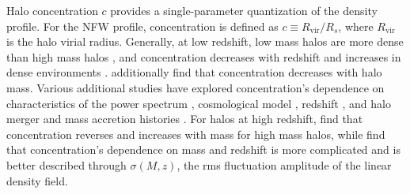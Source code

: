 
Halo concentration $c$ provides a single-parameter quantization of the density profile.  For the NFW profile, concentration is defined as $c \equiv R_{\mathrm{vir}} / R_{s}$, where $R_{\mathrm{vir}}$ is the halo virial radius.  Generally, at low redshift, low mass halos are more dense than high mass halos \citep{1997ApJ...490..493N}, and concentration decreases with redshift and increases in dense environments \citep{2001MNRAS.321..559B}.  \citet{2007MNRAS.381.1450N} additionally find that concentration decreases with halo mass.  Various additional studies have explored concentration's dependence on characteristics of the power spectrum \citep{2001ApJ...554..114E}, cosmological model \citep{2008MNRAS.391.1940M}, redshift \citep{2008MNRAS.387..536G, 2011MNRAS.411..584M}, and halo merger and mass accretion histories \citep{2002ApJ...568...52W, 2003MNRAS.339...12Z, 2009ApJ...707..354Z}.  For halos at high redshift, \citet{2011ApJ...740..102K} find that concentration reverses and increases with mass for high mass halos, while \citet{2012MNRAS.423.3018P} find that concentration's dependence on mass and redshift is more complicated and is better described through $\sigma(M,z)$, the rms fluctuation amplitude of the linear density field.

